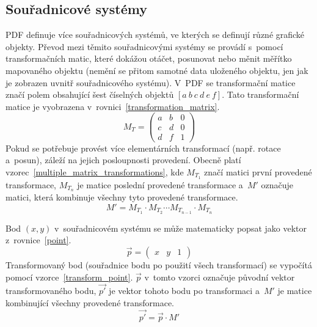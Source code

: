 \subsection*{Souřadnicové systémy}
PDF definuje více souřadnicových systémů, ve kterých se definují různé grafické
objekty. Převod mezi těmito souřadnicovými systémy se provádí s~pomocí
transformačních matic, které dokážou otáčet, posunovat nebo měnit měřítko
mapovaného objektu (nemění se přitom samotné data uloženého objektu, jen jak je
zobrazen uvnitř souřadnicového systému). V~PDF se transformační matice značí polem
obsahující šest číselných objektů $[a~b~c~d~e~f]$. Tato transformační matice je
vyobrazena v~rovnici~\eqref{transformation_matrix}.
\begin{equation}\label{transformation_matrix}
    M_T = 
    \begin{pmatrix}
        a & b & 0 \\
        c & d & 0 \\
        d & f & 1
    \end{pmatrix}
\end{equation}
Pokud se potřebuje provést více elementárních transformací 
(např. rotace a~posun), záleží na jejich posloupnosti provedení. Obecně
platí vzorec~\eqref{multiple_matrix_transformations}, kde $M_{T_1}$ značí matici
první provedené transformace, $M_{T_n}$ je matice poslední provedené transformace
a~$M'$ označuje matici, která kombinuje všechny tyto provedené transformace.
\begin{equation} \label{multiple_matrix_transformations}
    M' = M_{T_1} \cdot M_{T_2} \cdots M_{T_{n-1}} \cdot M_{T_n}
\end{equation}

Bod $(x, y)$ v~souřadnicovém systému se může matematicky popsat jako vektor
z~rovnice~\eqref{point}.
\begin{equation}\label{point}
    \overrightarrow{p}  = 
    \begin{pmatrix}
        x & y & 1
    \end{pmatrix}
\end{equation}
Transformovaný bod (souřadnice bodu po použití všech transformací) se vypočítá
pomocí vzorce~\eqref{transform_point}. $\overrightarrow{p}$ v~tomto vzorci označuje původní vektor
transformovaného bodu, $\overrightarrow{p'}$ je vektor tohoto bodu po transformaci a~$M'$ je matice
kombinující všechny provedené transformace.
\begin{equation} \label{transform_point}
    \overrightarrow{p'} = \overrightarrow{p} \cdot M'
\end{equation}

